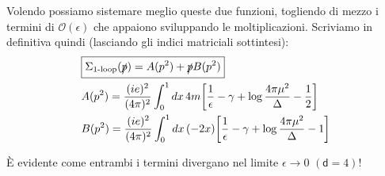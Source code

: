 \documentclass[../main.tex]{subfiles}
\begin{document}
Volendo possiamo sistemare meglio queste due funzioni, togliendo di mezzo i termini di $\mathscr{O}(\epsilon)$ che appaiono sviluppando le moltiplicazioni. Scriviamo in definitiva quindi (lasciando gli indici matriciali sottintesi):
\begin{equation}
    \begin{aligned}
    &\boxed{\Sigma_\text{1-loop}(\slashed p) = A(p^2) + \slashed p B(p^2)}\\
       & \begin{aligned} 
            & A(p^2) = \frac{(ie)^2}{(4\pi)^2} \int_0^1 dx\, 4m \biggl[ \frac{1}{\epsilon} - \mathbb\gamma + \log{\frac{4\pi \mu^{2}}{\Delta}} - \frac{1}{2}\biggr]\\
            & B(p^2)  = \frac{(ie)^2}{(4\pi)^2} \int_0^1 dx \,(-2x) \biggl[ \frac{1}{\epsilon} - \mathbb\gamma + \log{\frac{4\pi \mu^{2}}{\Delta}} -1\biggr]
        \end{aligned}
    \end{aligned}
    \label{eq:ESE_structure_revised}
\end{equation}

È evidente come entrambi i termini divergano nel limite $\epsilon \rightarrow 0$ $(\mathsf d = 4)$!
\end{document}

